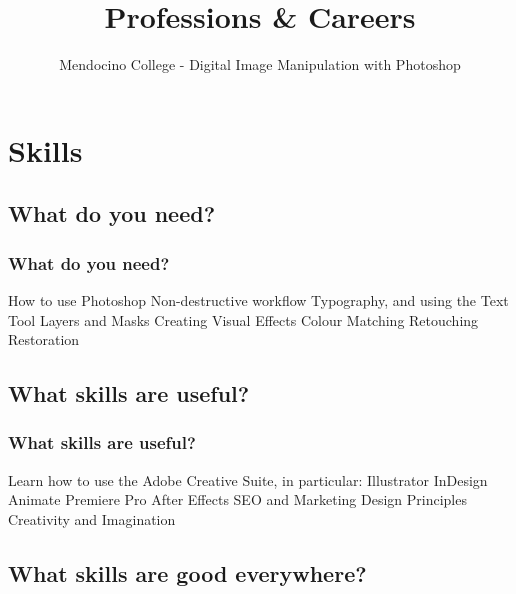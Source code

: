 \documentclass{beamer}
\title{Professions \& Careers}
\author{Mendocino College - Digital Image Manipulation with Photoshop}
\date{\vspace{-5em}}
\begin{document}
	{
		\begin{frame}
			\vspace{-35pt}
			\maketitle
		\end{frame}
	}
		
		
\section{Skills}

\subsection{What do you need?}		

	\begin{frame}
		\frametitle{What do you need?}
		\begin{outline}
			\1 How to use Photoshop
			\1 Non-destructive workflow
			\1 Typography, and using the Text Tool
			\1 Layers and Masks
			\1 Creating Visual Effects
			\1 Colour Matching
			\1 Retouching
			\1 Restoration
		\end{outline}
	\end{frame}

\subsection{What skills are useful?}		

\begin{frame}
	\frametitle{What skills are useful?}
	\begin{outline}
		\1 Learn how to use the Adobe Creative Suite, in particular:
		\2 Illustrator
		\2 InDesign
		\2 Animate
		\2 Premiere Pro
		\2 After Effects
		\1 SEO and Marketing
		\1 Design Principles
		\1 Creativity and Imagination
	\end{outline}
\end{frame}

\subsection{What skills are good everywhere?}		
\end{document}
